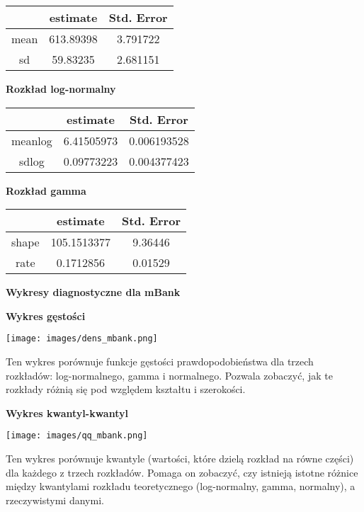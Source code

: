\documentclass[12pt]{article}
\begin{document}
\begin{table}[h]
\centering
\begin{tabular}{|c|c|c|}
\hline
 & estimate & Std. Error \\
\hline
mean & 613.89398 & 3.791722 \\
\hline
sd & 59.83235 & 2.681151 \\
\hline
\end{tabular}
\end{table}

\vspace{0.5 cm}
{\bf Rozkład log-normalny}
\vspace{0.5 cm}

\begin{table}[h]
\centering
\begin{tabular}{|c|c|c|}
\hline
 & estimate & Std. Error \\
\hline
meanlog & 6.41505973 & 0.006193528 \\
\hline
sdlog & 0.09773223 & 0.004377423 \\
\hline
\end{tabular}
\end{table}

\vspace{0.5 cm}
{\bf Rozkład gamma}
\vspace{0.5 cm}

\begin{table}[h]
\centering
\begin{tabular}{|c|c|c|}
\hline
 & estimate & Std. Error \\
\hline
shape & 105.1513377 & 9.36446 \\
\hline
rate & 0.1712856 & 0.01529 \\
\hline
\end{tabular}
\end{table}

\clearpage

{\bf \large Wykresy diagnostyczne dla mBank}

{\bf \medium Wykres gęstości}

\centerline{\texttt{[image: images/dens\_mbank.png]}}
Ten wykres porównuje funkcje gęstości prawdopodobieństwa dla trzech rozkładów: log-normalnego, gamma i normalnego. Pozwala zobaczyć, jak te rozkłady różnią się pod względem kształtu i szerokości.


{\bf \medium Wykres kwantyl-kwantyl}

\centerline{\texttt{[image: images/qq\_mbank.png]}}
Ten wykres porównuje kwantyle (wartości, które dzielą rozkład na równe części) dla każdego z trzech rozkładów. Pomaga on zobaczyć, czy istnieją istotne różnice między kwantylami rozkładu teoretycznego (log-normalny, gamma, normalny), a rzeczywistymi danymi.
\end{document}
